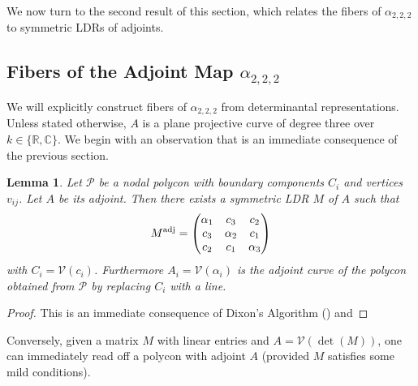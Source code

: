 \documentclass[a4paper,10pt]{amsart}
\theoremstyle{definition}
\theoremstyle{plain}
\newtheorem{lem}[defin]{Lemma}
\newcommand{\cP}{{\mathcal P}}
\newcommand{\cV}{{\mathcal V}}
\newcommand{\C}{{\mathbb C}}
\newcommand{\R}{{\mathbb R}}
\begin{document}
We now turn to the second result of this section, which relates the fibers of $\alpha_{2,2,2}$ to symmetric LDRs of adjoints.


\subsection{Fibers of the Adjoint Map $\alpha_{2,2,2}$} \label{sec:adjMap_fiber}

We will explicitly construct fibers of $\alpha_{2,2,2}$ from determinantal representations. Unless stated otherwise, $A$ is a plane projective curve of degree three over $k \in \{\R,\C\}$. We begin with an observation that is an immediate consequence of the previous section.

\begin{lem} \label{lem:LDRFromPolycon}
 Let $\cP$ be a nodal polycon with boundary components $C_i$ and vertices $v_{ij}$. Let $A$ be its adjoint. Then there exists a symmetric LDR $M$ of $A$ such that
 \begin{equation*}
     M^{\textup{adj}} = \begin{pmatrix}
         \alpha_1 & c_3 & c_2 \\
         c_3 & \alpha_2 & c_1 \\
         c_2 & c_1 & \alpha_3
     \end{pmatrix}
 \end{equation*}
 with $C_i = \cV(c_i)$. Furthermore $A_i = \cV(\alpha_i)$ is the adjoint curve of the polycon obtained from $\cP$ by replacing $C_i$ with a line.
\end{lem}

\begin{proof}
 This is an immediate consequence of Dixon's Algorithm () and 
\end{proof}

Conversely, given a matrix $M$ with linear entries and $A = \cV(\det(M))$, one can immediately read off a polycon with adjoint $A$ (provided $M$ satisfies some mild conditions).
\end{document}
